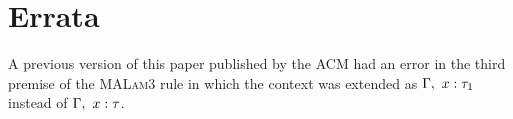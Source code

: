 \section*{Errata}
\label{sec:errata}

A previous version of this paper published by the ACM had an error in the third premise of the \textsc{MALam3} rule in which the context was extended as $\Gamma , ~x : \tau_1$ instead of $\Gamma , ~x : \tau$.
